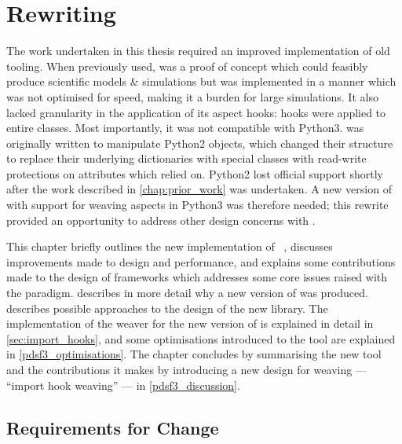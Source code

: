 \chapter{Rewriting \pdsf{}}
\label{chap:pdsf_rewrite}



The work undertaken in this thesis required an improved implementation of old
tooling. When previously used, \pdsf{} was a proof of concept which could
feasibly produce scientific models \& simulations but was implemented in a
manner which was not optimised for speed, making it a burden for large
simulations. It also lacked granularity in the application of its aspect hooks:
hooks were applied to entire classes. Most importantly, it was not compatible
with Python3. \pdsf{} was originally written to manipulate Python2 objects,
which changed their structure to replace their underlying dictionaries with
special classes with read-write protections on attributes which \pdsf{} relied
on. Python2 lost official support shortly after the work described in
\cref{chap:prior_work} was undertaken. A new version of \pdsf{} with support for
weaving aspects in Python3 was therefore needed; this rewrite provided an
opportunity to address other design concerns with \pdsf{}.

This chapter briefly outlines the new implementation of
\pdsf{}~\cite{pdsf_source_in_analysis_repo}, discusses improvements made to
design and performance, and explains some contributions made to the design of
\aspectorientation{} frameworks which addresses some core issues raised with the
paradigm.  describes in more detail why a new
version of \pdsf{} was produced.  describes possible
approaches to the design of the new library. The implementation of the weaver
for the new version of \pdsf{} is explained in detail in
\cref{sec:import_hooks}, and some optimisations introduced to the tool are
explained in \cref{pdsf3_optimisations}. The chapter concludes by summarising
the new tool and the contributions it makes by introducing a new design for
weaving --- ``import hook weaving'' --- in \cref{pdsf3_discussion}.


\section{Requirements for Change}\label{sec:pdsf3requirements}

